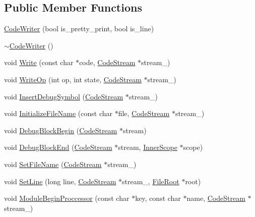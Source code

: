 \subsection*{Public Member Functions}
\begin{DoxyCompactItemize}
\item 
\hyperlink{classmocha_1_1_code_writer_aaab0ffcfe18c2a2d0b5c105cc6b1760c}{CodeWriter} (bool is\_\-pretty\_\-print, bool is\_\-line)
\item 
\hyperlink{classmocha_1_1_code_writer_a3801004e7976480ab4c6f038c6cfba81}{$\sim$CodeWriter} ()
\item 
void \hyperlink{classmocha_1_1_code_writer_abcd4082915eaffa64ca31c69cc741998}{Write} (const char $\ast$code, \hyperlink{classmocha_1_1_code_stream}{CodeStream} $\ast$stream\_\-)
\item 
void \hyperlink{classmocha_1_1_code_writer_aee997b027d9115d8c074e73d56cbc0d1}{WriteOp} (int op, int state, \hyperlink{classmocha_1_1_code_stream}{CodeStream} $\ast$stream\_\-)
\item 
void \hyperlink{classmocha_1_1_code_writer_abbc219cc9873f857db5132f78bc930c6}{InsertDebugSymbol} (\hyperlink{classmocha_1_1_code_stream}{CodeStream} $\ast$stream\_\-)
\item 
void \hyperlink{classmocha_1_1_code_writer_a56d11286670e778acb3291460f85083c}{InitializeFileName} (const char $\ast$file, \hyperlink{classmocha_1_1_code_stream}{CodeStream} $\ast$stream\_\-)
\item 
void \hyperlink{classmocha_1_1_code_writer_a5d9dbfcecb429b86bde76756d19eb104}{DebugBlockBegin} (\hyperlink{classmocha_1_1_code_stream}{CodeStream} $\ast$stream)
\item 
void \hyperlink{classmocha_1_1_code_writer_a7bbf005f34cf317ee4e80bde03fc9fdb}{DebugBlockEnd} (\hyperlink{classmocha_1_1_code_stream}{CodeStream} $\ast$stream, \hyperlink{classmocha_1_1_inner_scope}{InnerScope} $\ast$scope)
\item 
void \hyperlink{classmocha_1_1_code_writer_a5267a95969ca16cac16ce2438e259aa3}{SetFileName} (\hyperlink{classmocha_1_1_code_stream}{CodeStream} $\ast$stream\_\-)
\item 
void \hyperlink{classmocha_1_1_code_writer_aad28d04cdd03938bf2aa85f80cda9019}{SetLine} (long line, \hyperlink{classmocha_1_1_code_stream}{CodeStream} $\ast$stream\_\-, \hyperlink{classmocha_1_1_file_root}{FileRoot} $\ast$root)
\item 
void \hyperlink{classmocha_1_1_code_writer_ad9d7877e35623905a58defdba4d28ead}{ModuleBeginProccessor} (const char $\ast$key, const char $\ast$name, \hyperlink{classmocha_1_1_code_stream}{CodeStream} $\ast$stream\_\-)

\end{DoxyCompactItemize}
